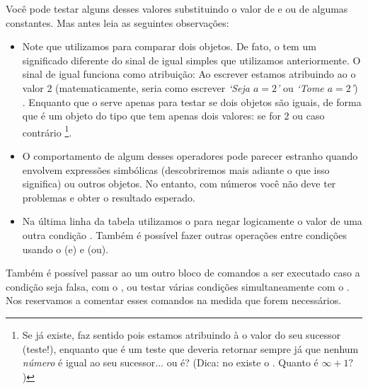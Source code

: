 Você pode testar alguns desses valores
substituindo o valor  de  e  ou de algumas constantes.
Mas antes leia as seguintes observações:
\begin{itemize}
  \item Note que utilizamos \ils{==} para comparar dois objetos. De fato, o \ils{==}
  tem um significado diferente do sinal de igual simples \ils{=} que utilizamos
  anteriormente. O sinal de igual funciona como atribuição: Ao escrever 
  estamos atribuindo ao  o valor $2$ (matematicamente, seria como
  escrever \textit{`Seja $a = 2$'} ou \textit{`Tome $a = 2$'})  . Enquanto que o \ils{==} serve
  apenas para testar se dois objetos são iguais,
  de forma que  é um objeto do tipo  que tem apenas
  dois valores:  se  for $2$ ou  caso contrário
  \footnote{Se  já existe,
   faz sentido pois estamos atribuindo à  o valor do seu sucessor
  (teste!), enquanto que  é um teste que deveria
  retornar sempre  já que nenhum \emph{número} é igual ao seu sucessor... 
  ou é? (Dica: no \sage existe o . Quanto é $\infty + 1?$)}.
  \item O comportamento de algum desses operadores pode parecer estranho
  quando envolvem expressões simbólicas (descobriremos mais adiante o que
  isso significa) ou outros objetos. No entanto, com números você
  não deve ter problemas e obter o resultado esperado.
  \item Na última linha da tabela utilizamos o  para negar
  logicamente o valor de uma outra condição . Também é possível
  fazer outras operações entre condições usando o  (e) e
   (ou).
\end{itemize}

Também é possível passar ao \sage um outro bloco
de comandos a ser executado caso a condição seja
falsa, com o , ou testar várias condições simultaneamente
com o . Nos reservamos a comentar esses comandos
na medida que forem necessários.



